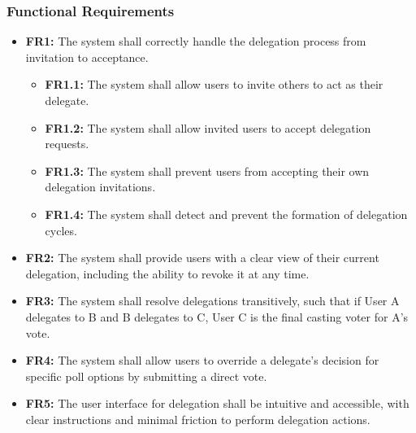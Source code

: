 \subsubsection{Functional Requirements}
\begin{itemize}
    \item \textbf{FR1:} The system shall correctly handle the delegation process from invitation to acceptance.
    \begin{itemize}
        \item \textbf{FR1.1:} The system shall allow users to invite others to act as their delegate.
        \item \textbf{FR1.2:} The system shall allow invited users to accept delegation requests.
        \item \textbf{FR1.3:} The system shall prevent users from accepting their own delegation invitations.
        \item \textbf{FR1.4:} The system shall detect and prevent the formation of delegation cycles.
    \end{itemize}

    \item \textbf{FR2:} The system shall provide users with a clear view of their current delegation, including the ability to revoke it at any time.

    \item \textbf{FR3:} The system shall resolve delegations transitively, such that if User A delegates to B and B delegates to C, User C is the final casting voter for A's vote.

    \item \textbf{FR4:} The system shall allow users to override a delegate's decision for specific poll options by submitting a direct vote.
    
    \item \textbf{FR5:} The user interface for delegation shall be intuitive and accessible, with clear instructions and minimal friction to perform delegation actions.
\end{itemize}

